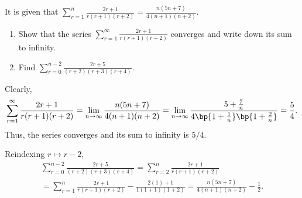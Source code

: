 \begin{problem}
    It is given that $\sum_{r = 1}^n \frac{2r+1}{r(r+1)(r+2)} = \frac{n(5n+7)}{4(n+1)(n+2)}$.

    \begin{enumerate}
        \item Show that the series $\sum_{r = 1}^\infty \frac{2r+1}{r(r+1)(r+2)}$ converges and write down its sum to infinity.
        \item Find $\sum_{r = 0}^{n-2} \frac{2r+5}{(r+2)(r+3)(r+4)}$.
    \end{enumerate}
\end{problem}
\begin{solution}
    \begin{ppart}
        Clearly, \[\sum_{r = 1}^\infty \frac{2r+1}{r(r+1)(r+2)} = \lim_{n \to \infty} \frac{n(5n+7)}{4(n+1)(n+2)} = \lim_{n \to \infty} \frac{5 + \frac7n}{4 \bp{1 + \frac1n} \bp{1 + \frac2n}} = \frac54.\] Thus, the series converges and its sum to infinity is $5/4$.
    \end{ppart}
    \begin{ppart}
        Reindexing $r \mapsto r - 2$,
        \begin{gather*}
            \sum_{r = 0}^{n-2} \frac{2r+5}{(r+2)(r+3)(r+4)} = \sum_{r = 2}^n \frac{2r+1}{r(r+1)(r+2)} \\
            = \sum_{r = 1}^n \frac{2r+1}{r(r+1)(r+2)} - \frac{2(1) + 1}{1 (1 + 1) (1 + 2)} = \frac{n(5n+7)}{4(n+1)(n+2)} - \frac12.
        \end{gather*}
    \end{ppart}
\end{solution}